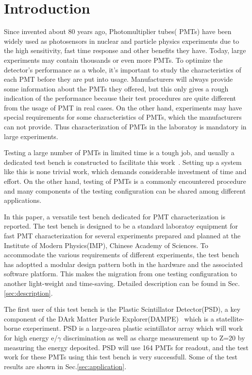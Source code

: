 \documentclass[review, times]{elsarticle}
\begin{document}
\section{Introduction}
\label{sec:introduction}

Since invented about 80 years ago, Photomultiplier tubes( PMTs) have been widely used as photosensors in nuclear and particle physics experiments due to the high sensitivity, fast time response and other benefits they have.
Today, large experiments may contain thousands or even more PMTs.
To optimize the detector's performance as a whole, it's important to study the characteristics of each PMT before they are put into usage. 
Manufacturers will always provide some information about the PMTs they offered, but this only gives a rough indication of the performance because their test procedures are quite different from the usage of PMT in real cases.
On the other hand, experiments may have special requirements for some characteristics of PMTs, which the manufacturers can not provide. 
Thus characterization of PMTs in the laboratoy is mandatory in large experiments.

Testing a large number of PMTs in limited time is a tough job, and usually a dedicated test bench is constructed to facilitate this work~\cite{barnhill_testing_2008,akgun_complete_2005,adragna_pmt-block_2006}.
Setting up a system like this is none trivial work, which demands considerable investment of time and effort.
On the other hand, testing of PMTs is a commonly encountered procedure and many components of the testing configuration can be shared among different applications.

In this paper, a versatile test bench dedicated for PMT characterization is reported.
The test bench is designed to be a standard laboratoy equipment for fast PMT characterization for several experiments prepared and planned at the Institute of Modern Physics(IMP), Chinese Academy of Sciences.
To accommodate the various requirements of different experiments, the test bench has adoptted a modular design pattern both in the hardware and the associated software platform.
This makes the migration from one testing configuration to another light-weight and time-saving.
Detailed description can be found in Sec.\ref{sec:description}.

The first user of this test bench is the Plastic Scintillator Detector(PSD), a key component of the DArk Matter Paricle Explorer(DAMPE)~\cite{Chang_Jin_dampe} which is a statellite-borne exeperiment. 
PSD is a large-area plastic scintillator array which will work for high energy e/$\gamma$ discrimination as well as charge measurement up to Z=20 by measuring the energy deposited.
PSD will use 164 PMTs for readout, and the test work for these PMTs using this test bench is very successfull. 
Some of the test results are shown in Sec.\ref{sec:application}.
\end{document}

